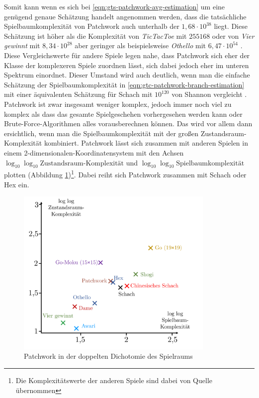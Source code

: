 Somit kann \textendash{} wenn es sich bei \ref{eqn:gts-patchwork-avg-estimation} um eine genügend genaue Schätzung handelt \textendash{} angenommen werden, dass die tatsächliche Spielbaumkomplexität von Patchwork auch unterhalb der $1{,}68 \cdot 10^{38}$ liegt. Diese Schätzung ist höher als die Komplexität von \emph{TicTacToe} mit $255168$ \cite{2024.TicTacToe} oder von \emph{Vier gewinnt} mit $8{,}34 \cdot 10^{28}$ \cite[S. 3]{2019.GameTreeComplexityEstimation} aber geringer als beispielsweise \emph{Othello} mit $6{,}47 \cdot 10^{54}$ \cite[S. 4]{2019.GameTreeComplexityEstimation}. Diese Vergleichswerte für andere Spiele legen nahe, dass Patchwork sich eher der Klasse der komplexeren Spiele zuordnen lässt, sich dabei jedoch eher im unteren Spektrum einordnet. Dieser Umstand wird auch deutlich, wenn man die einfache Schätzung der Spielbaumkomplexität in \ref{eqn:gtc-patchwork-branch-estimation} mit einer äquivalenten Schätzung für Schach mit $10^{120}$ von Shannon vergleicht \cite[S. 4]{1950.ChessShannon}. Patchwork ist zwar insgesamt weniger komplex, jedoch immer noch viel zu komplex als dass das gesamte Spielgeschehen vorhergesehen werden kann oder Brute-Force-Algorithmen alles vorausberechnen können. Das wird vor allem dann ersichtlich, wenn man die Spielbaumkomplexität mit der großen Zustandsraum-Komplexität kombiniert. Patchwork lässt sich zusammen mit anderen Spielen in einem 2-dimensionalen-Koordinatensystem mit den Achsen \emph{$\log_{10} \log_{10} \text{Zustandsraum-Komplexität}$} und \emph{$\log_{10} \log_{10} \text{Spielbaumkomplexität}$} plotten (Abbildung \ref{fig:game-complexity-coordinate-system})\footnote{Die Komplexitätswerte der anderen Spiele sind dabei von Quelle \cite[S. 300]{2002.GamesSolved} übernommen}. Dabei reiht sich Patchwork zusammen mit Schach oder Hex ein.

\begin{figure}[!ht]
    \centering
    \includegraphics[width=0.85\textwidth]{res/pictures/game-complexity-coordinate-system.pdf}
    \caption{Patchwork in der doppelten Dichotomie des Spielraums}
    \label{fig:game-complexity-coordinate-system}
\end{figure}

